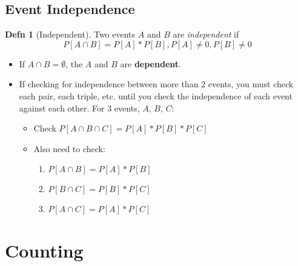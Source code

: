 \documentclass[10pt,letterpaper,final,twoside,notitlepage]{article}
\theoremstyle{plain}
\theoremstyle{definition}
\newtheorem{definition}{Defn}
\begin{document}
	\subsection{Event Independence} \label{subsec:Event Independence}
		\begin{definition}[Independent] \label{def:Event Independence}
			Two events $A$ and $B$ are \emph{independent} if 
			\begin{equation} \label{eq:Event Independence}
				P \left[ A \cap B \right] = P \left[ A \right] * P \left[ B \right], P\left[ A \right] \neq 0, P\left[ B \right] \neq 0
			\end{equation}
			\begin{itemize}[noitemsep, nolistsep]
				\item If $A \cap B = \emptyset$, the $A$ and $B$ are \textbf{dependent}.
				\item If checking for independence between more than 2 events, you must check each pair, each triple, etc. until you check the independence of each event against each other. For 3 events, $A$, $B$, $C$:
					\begin{itemize}[noitemsep, nolistsep]
						\item Check $P \left[ A \cap B \cap C \right] = P \left[ A \right] * P \left[ B \right] * P \left[ C \right]$
						\item Also need to check:
							\begin{enumerate}
								\item $P \left[ A \cap B \right] = P \left[ A \right] * P \left[ B \right]$
								\item $P \left[ B \cap C \right] = P \left[ B \right] * P \left[ C \right]$
								\item $P \left[ A \cap C \right] = P \left[ A \right] * P \left[ C \right]$
							\end{enumerate}
					\end{itemize}
			\end{itemize}
		\end{definition}

\section{Counting} \label{sec:Counting}
\end{document}
